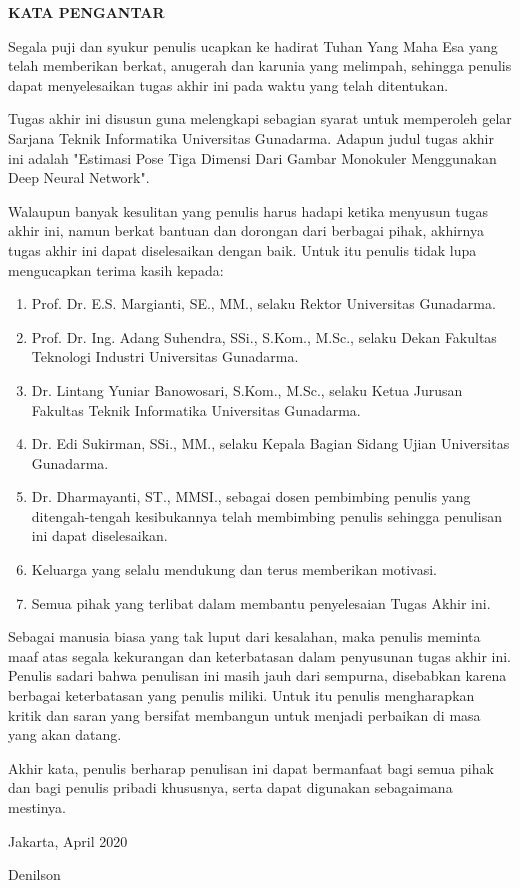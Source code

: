 \newpage %
\begin{center}
  \begin{large}\textbf{KATA PENGANTAR}\\\end{large}
\end{center}
\vspace{5mm}


Segala puji dan syukur penulis ucapkan ke hadirat Tuhan Yang Maha Esa yang telah memberikan berkat,
anugerah dan karunia yang melimpah, sehingga penulis dapat menyelesaikan tugas akhir ini pada waktu
yang telah ditentukan.

Tugas akhir ini disusun guna melengkapi sebagian syarat untuk memperoleh gelar Sarjana Teknik
Informatika Universitas Gunadarma. Adapun judul tugas akhir ini adalah "Estimasi Pose Tiga Dimensi
Dari Gambar Monokuler Menggunakan Deep Neural Network".

Walaupun banyak kesulitan yang penulis harus hadapi ketika menyusun tugas akhir ini, namun berkat
bantuan dan dorongan dari berbagai pihak, akhirnya tugas akhir ini dapat diselesaikan dengan baik.
Untuk itu penulis tidak lupa mengucapkan terima kasih kepada:

\begin{enumerate}
  \item Prof. Dr. E.S. Margianti, SE., MM., selaku Rektor Universitas Gunadarma.
  \item Prof. Dr. Ing. Adang Suhendra, SSi., S.Kom., M.Sc., selaku Dekan Fakultas Teknologi Industri Universitas Gunadarma.
  \item Dr. Lintang Yuniar Banowosari, S.Kom., M.Sc., selaku Ketua Jurusan Fakultas Teknik Informatika Universitas Gunadarma.
  \item Dr. Edi Sukirman, SSi., MM., selaku Kepala Bagian Sidang Ujian Universitas Gunadarma.
  \item Dr. Dharmayanti, ST., MMSI., sebagai dosen pembimbing penulis yang ditengah-tengah kesibukannya
        telah membimbing penulis sehingga penulisan ini dapat diselesaikan.
  \item Keluarga yang selalu mendukung dan terus memberikan motivasi.
  \item Semua pihak yang terlibat dalam membantu penyelesaian Tugas Akhir ini.

\end{enumerate}

Sebagai manusia biasa yang tak luput dari kesalahan, maka penulis meminta maaf atas segala
kekurangan dan keterbatasan dalam penyusunan tugas akhir ini. Penulis sadari bahwa penulisan ini
masih jauh dari sempurna, disebabkan karena berbagai keterbatasan yang penulis miliki. Untuk itu
penulis mengharapkan kritik dan saran yang bersifat membangun untuk menjadi perbaikan di masa yang
akan datang.

Akhir kata, penulis berharap penulisan ini dapat bermanfaat bagi semua pihak dan bagi penulis
pribadi khususnya, serta dapat digunakan sebagaimana mestinya.


\vspace{0.5 cm}
\begin{flushright}
  Jakarta, April 2020

  \vspace{2 cm}
  Denilson
\end{flushright}